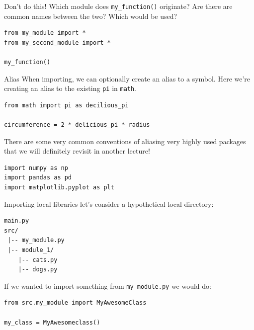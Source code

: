 \documentclass[10pt]{beamer}
\begin{document}
\begin{frame}[label={sec:org223aee5},fragile]{Don't do this!}
 Which module does \texttt{my\_function()} originate? Are there are common names between the
two? Which would be used?

\begin{verbatim}
from my_module import *
from my_second_module import *

my_function()
\end{verbatim}
\end{frame}

\begin{frame}[label={sec:org76af65d},fragile]{Alias}
 When importing, we can optionally create an alias to a symbol. Here we're creating an
alias to the existing \texttt{pi} in \texttt{math}.

\begin{verbatim}
from math import pi as decilious_pi

circumference = 2 * delicious_pi * radius
\end{verbatim}

There are some very common conventions of aliasing very highly used packages that we
will definitely revisit in another lecture!

\begin{verbatim}
import numpy as np
import pandas as pd
import matplotlib.pyplot as plt
\end{verbatim}
\end{frame}

\begin{frame}[label={sec:org5fe7f88},fragile]{Importing local libraries}
 let's consider a hypothetical local directory:

\begin{verbatim}
main.py
src/
 |-- my_module.py
 |-- module_1/
	|-- cats.py
	|-- dogs.py
\end{verbatim}

If we wanted to import something from \texttt{my\_module.py} we would do:

\begin{verbatim}
from src.my_module import MyAwesomeClass

my_class = MyAwesomeclass()
\end{verbatim}
\end{frame}
\end{document}
